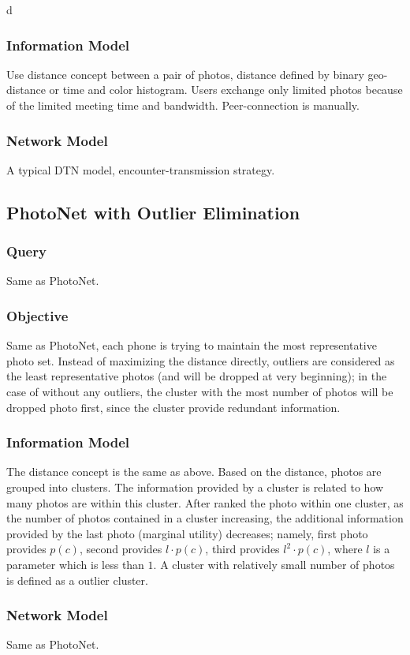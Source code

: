 d\documentclass[letterpaper]{sig-alternate-10pt}
\begin{document}
\subsubsection{Information Model}
Use distance concept between a pair of photos, distance defined by binary geo-distance or time and color histogram. Users exchange only limited photos because of the limited meeting time and bandwidth. Peer-connection is manually.
\subsubsection{Network Model}
A typical DTN model, encounter-transmission strategy.

\subsection{PhotoNet with Outlier Elimination}
\subsubsection{Query}
Same as PhotoNet.
\subsubsection{Objective}
Same as PhotoNet, each phone is trying to maintain the most representative photo set. Instead of maximizing the distance directly, outliers are considered as the least representative photos (and will be dropped at very beginning); in the case of without any outliers, the cluster with the most number of photos will be dropped photo first, since the cluster provide redundant information.
\subsubsection{Information Model}
The distance concept is the same as above. Based on the distance, photos are grouped into clusters. The information provided by a cluster is related to how many photos are within this cluster. After ranked the photo within one cluster, as the number of photos contained in a cluster increasing, the additional information provided by the last photo (marginal utility) decreases; namely, first photo provides $p(c)$, second provides $l\cdot p(c)$, third provides $l^2\cdot p(c)$, where $l$ is a parameter which is less than $1$. A cluster with relatively small number of photos is defined as a outlier cluster.
\subsubsection{Network Model}
Same as PhotoNet.
\end{document}

